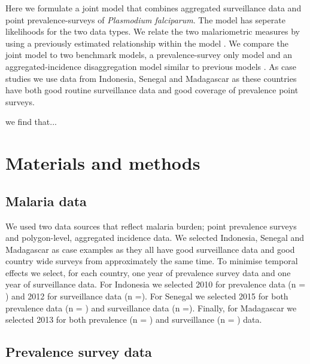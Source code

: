 \documentclass[10pt,letterpaper]{article}
\begin{document}

Here we formulate a joint model that combines aggregated surveillance data and point prevalence-surveys of \emph{Plasmodium falciparum}.
The model has seperate likelihoods for the two data types.
We relate the two malariometric measures by using a previously estimated relationship within the model \cite{cameron2015defining}.
We compare the joint model to two benchmark models, a prevalence-survey only model and an aggregated-incidence disaggregation model similar to previous models \cite{sturrock2014fine, wilson2017pointless}.
As case studies we use data from Indonesia, Senegal and Madagascar as these countries have both good routine surveillance data and good coverage of prevalence point surveys.


we find that...


\section*{Materials and methods}


\subsection*{Malaria data}

We used two data sources that reflect malaria burden; point prevalence surveys and polygon-level, aggregated incidence data.
We selected Indonesia, Senegal and Madagascar as case examples as they all have good surveillance data and good country wide surveys from approximately the same time.
To minimise temporal effects we select, for each country, one year of prevalence survey data and one year of surveillance data.
For Indonesia we selected 2010 for prevalence data (n = ) and 2012 for surveillance data (n =).
For Senegal we selected 2015 for both prevalence data (n = ) and surveillance data (n =).
Finally, for Madagascar we selected 2013 for both prevalence (n = ) and surveillance (n = ) data.



\subsection*{Prevalence survey data}
\end{document}
